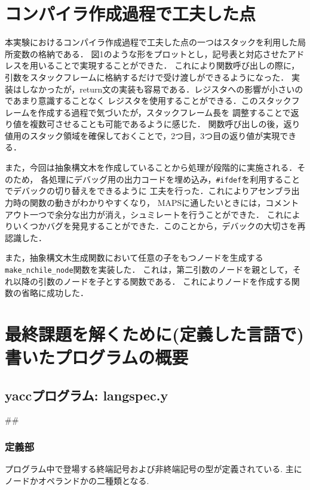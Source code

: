 \documentclass[a4paper,11pt]{jarticle}
\begin{document}
{%
\section{コンパイラ作成過程で工夫した点}
本実験におけるコンパイラ作成過程で工夫した点の一つはスタックを利用した局所変数の格納である．
図1のような形をプロットとし，記号表と対応させたアドレスを用いることで実現することができた．
これにより関数呼び出しの際に，引数をスタックフレームに格納するだけで受け渡しができるようになった．
実装はしなかったが，return文の実装も容易である．レジスタへの影響が小さいのであまり意識することなく
レジスタを使用することができる．このスタックフレームを作成する過程で気づいたが，スタックフレーム長を
調整することで返り値を複数可させることも可能であるように感じた．
関数呼び出しの後，返り値用のスタック領域を確保しておくことで，2つ目，3つ目の返り値が実現できる．

また，今回は抽象構文木を作成していることから処理が段階的に実施される．そのため，
各処理にデバッグ用の出力コードを埋め込み，\verb|#ifdef|を利用することでデバックの切り替えをできるように
工夫を行った．これによりアセンブラ出力時の関数の動きがわかりやすくなり，
MAPSに通したいときには，コメントアウト一つで余分な出力が消え，シュミレートを行うことができた．
これによりいくつかバグを発見することができた．このことから，デバックの大切さを再認識した．

また，抽象構文木生成関数において任意の子をもつノードを生成する\verb|make_nchile_node|関数を実装した．
これは，第二引数のノードを親として，それ以降の引数のノードを子とする関数である．
これによりノードを作成する関数の省略に成功した．

\section{最終課題を解くために(定義した言語で)書いたプログラムの概要}
\subsection{yaccプログラム: langspec.y}
##
\subsubsection{定義部}
プログラム中で登場する終端記号および非終端記号の型が定義されている.
主にノードかオペランドかの二種類となる.
}
\end{document}

